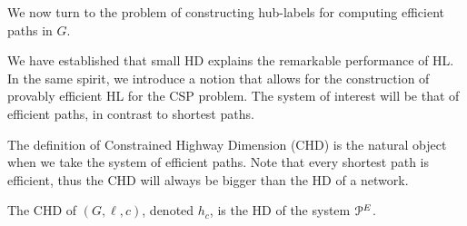 
We now turn to the problem of constructing hub-labels for computing efficient paths in $G$.

We have established that small HD explains the remarkable performance of HL.
In the same spirit, we introduce a notion that allows for the construction of provably efficient HL for the CSP problem.
The system of interest will be that of efficient paths, in contrast to shortest paths.


The definition of Constrained Highway Dimension (CHD) is the natural object when we take the system of efficient paths.
Note that every shortest path is efficient, thus the CHD will always be bigger than the HD of a network.

\begin{definition}
The CHD of $(G,\ell,c)$, denoted $h_c$, is the HD of the system $\mathcal{P}^E$.
\end{definition}



